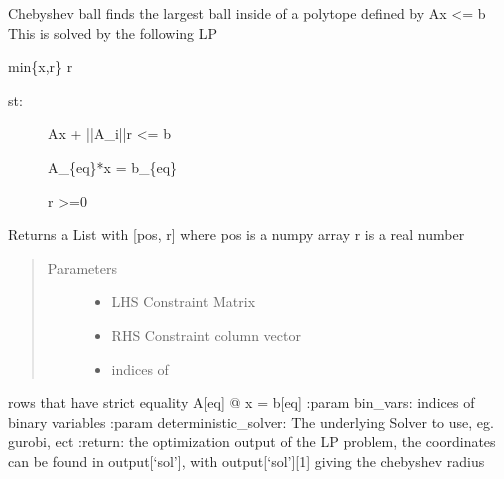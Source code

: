 \documentclass[letterpaper,10pt,english]{sphinxmanual}
\begin{document}
\begin{fulllineitems}
\label{\detokenize{mpo.utils:mpo.utils.chebyshev_ball.chebyshev_ball}}
\sphinxAtStartPar
Chebyshev ball finds the largest ball inside of a polytope defined by Ax \textless{}= b
This is solved by the following LP

\sphinxAtStartPar
min\{x,r\} \sphinxhyphen{}r
\begin{description}
\item[{st:}] \leavevmode
\sphinxAtStartPar
Ax + ||A\_i||r \textless{}= b

\sphinxAtStartPar
A\_\{eq\}*x = b\_\{eq\}

\sphinxAtStartPar
r \textgreater{}=0

\end{description}

\sphinxAtStartPar
Returns a List with {[}pos, r{]}
where pos is a numpy array
r is a real number
\begin{quote}\begin{description}
\item[{Parameters}] \leavevmode\begin{itemize}
\item {} 
\sphinxAtStartPar
{} \textendash{} LHS Constraint Matrix

\item {} 
\sphinxAtStartPar
{} \textendash{} RHS Constraint column vector

\item {} 
\sphinxAtStartPar
{} \textendash{} indices of

\end{itemize}

\end{description}\end{quote}

\sphinxAtStartPar
rows that have strict equality A{[}eq{]} @ x = b{[}eq{]}
:param bin\_vars: indices of binary variables
:param deterministic\_solver: The underlying Solver to use, eg. gurobi, ect
:return: the optimization output of the LP problem, the coordinates can be found in output{[}‘sol’{]}, with output{[}‘sol’{]}{[}\sphinxhyphen{}1{]}
giving the chebyshev radius

\end{fulllineitems}
\end{document}
